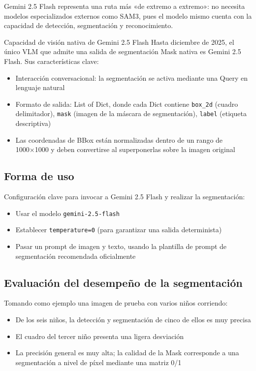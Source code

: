 \documentclass[a4paper]{article}
\begin{document}
Gemini 2.5 Flash representa una ruta más «de extremo a extremo»: no necesita modelos especializados externos como SAM3, pues el modelo mismo cuenta con la capacidad de detección, segmentación y reconocimiento.

\begin{importantbox}{Capacidad de visión nativa de Gemini 2.5 Flash}
Hasta diciembre de 2025, el único VLM que admite una salida de segmentación Mask nativa es Gemini 2.5 Flash. Sus características clave:
\begin{itemize}
    \item Interacción conversacional: la segmentación se activa mediante una Query en lenguaje natural
    \item Formato de salida: List of Dict, donde cada Dict contiene \texttt{box\_2d} (cuadro delimitador), \texttt{mask} (imagen de la máscara de segmentación), \texttt{label} (etiqueta descriptiva)
    \item Las coordenadas de BBox están normalizadas dentro de un rango de 1000×1000 y deben convertirse al superponerlas sobre la imagen original
\end{itemize}
\end{importantbox}

\subsection{Forma de uso}

Configuración clave para invocar a Gemini 2.5 Flash y realizar la segmentación:

\begin{itemize}
    \item Usar el modelo \texttt{gemini-2.5-flash}
    \item Establecer \texttt{temperature=0} (para garantizar una salida determinista)
    \item Pasar un prompt de imagen y texto, usando la plantilla de prompt de segmentación recomendada oficialmente
\end{itemize}

\subsection{Evaluación del desempeño de la segmentación}

Tomando como ejemplo una imagen de prueba con varios niños corriendo:
\begin{itemize}
    \item De los seis niños, la detección y segmentación de cinco de ellos es muy precisa
    \item El cuadro del tercer niño presenta una ligera desviación
    \item La precisión general es muy alta; la calidad de la Mask corresponde a una segmentación a nivel de píxel mediante una matriz 0/1
\end{itemize}
\end{document}
